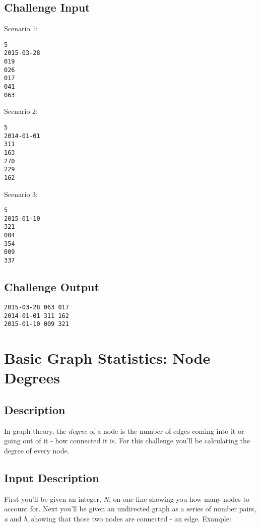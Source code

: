 \subsection*{Challenge Input}\label{challenge-input-19}

Scenario 1:

\begin{lstlisting}
5
2015-03-28
019 
026 
017 
041 
063 
\end{lstlisting}

Scenario 2:

\begin{lstlisting}
5 
2014-01-01
311 
163 
270 
229 
162 
\end{lstlisting}

Scenario 3:

\begin{lstlisting}
5
2015-01-10
321 
004
354
009 
337 
\end{lstlisting}

\subsection*{Challenge Output}\label{challenge-output-16}

\begin{lstlisting}
2015-03-28 063 017
2014-01-01 311 162
2015-01-10 009 321
\end{lstlisting}


\section{Basic Graph Statistics: Node Degrees}

\subsection*{Description}\label{description-26}

In graph theory, the \emph{degree} of a node is the number of edges
coming into it or going out of it - how connected it is. For this
challenge you'll be calculating the degree of every node.

\subsection*{Input Description}\label{input-description-18}

First you'll be given an integer, \emph{N}, on one line showing you how
many nodes to account for. Next you'll be given an undirected graph as a
series of number pairs, \emph{a} and \emph{b}, showing that those two
nodes are connected - an edge. Example:


